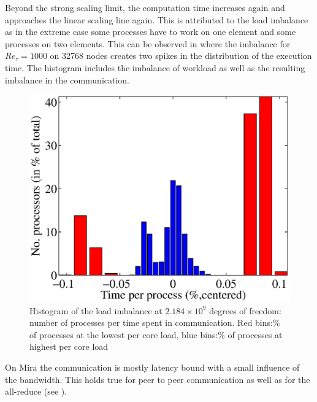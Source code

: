 \documentclass{sig-alternate}
\begin{document}
Beyond the strong scaling limit, the computation time increases again and
approaches the linear scaling line again. This is attributed to the load
imbalance as in the extreme case some processes have to work on one element and
some processes on two elements. This can be observed in
where the imbalance for $Re_{\tau}=1000$ on 32768 nodes creates two spikes in the
distribution of the execution time. The histogram includes the imbalance of
workload as well as the resulting imbalance in the communication.
\begin{figure}
  \centering
  \includegraphics[width=\linewidth]{./figures/loadbalance.eps}
  \caption{Histogram of the load imbalance at $2.184\times10^9$ degrees of freedom: number of processes per time spent in communication. Red bins:\% of processes at the lowest per core load, blue bins:\% of processes at highest per core load}
  \label{fig:imbalancehist}
\end{figure}


On Mira the communication is mostly latency bound with a small influence of the
bandwidth. This holds true for peer to peer communication as well as for the
all-reduce (see ).
\end{document}
